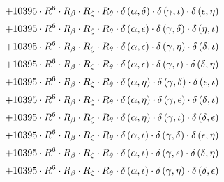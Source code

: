 \begin{subequations}
\begin{gather}
 \\[0.2em] \notag 		 + 10395 \cdot R^{6} \cdot R_{\beta{}} \cdot R_{\zeta{}} \cdot R_{\theta{}} \cdot \delta{}\left(\alpha{}, \delta{}\right) \cdot \delta{}\left(\gamma{}, \iota{}\right) \cdot \delta{}\left(\epsilon{}, \eta{}\right) 
 \\[0.2em] \notag 		 + 10395 \cdot R^{6} \cdot R_{\beta{}} \cdot R_{\zeta{}} \cdot R_{\theta{}} \cdot \delta{}\left(\alpha{}, \epsilon{}\right) \cdot \delta{}\left(\gamma{}, \delta{}\right) \cdot \delta{}\left(\eta{}, \iota{}\right) 
 \\[0.2em] \notag 		 + 10395 \cdot R^{6} \cdot R_{\beta{}} \cdot R_{\zeta{}} \cdot R_{\theta{}} \cdot \delta{}\left(\alpha{}, \epsilon{}\right) \cdot \delta{}\left(\gamma{}, \eta{}\right) \cdot \delta{}\left(\delta{}, \iota{}\right) 
 \\[0.2em] \notag 		 + 10395 \cdot R^{6} \cdot R_{\beta{}} \cdot R_{\zeta{}} \cdot R_{\theta{}} \cdot \delta{}\left(\alpha{}, \epsilon{}\right) \cdot \delta{}\left(\gamma{}, \iota{}\right) \cdot \delta{}\left(\delta{}, \eta{}\right) 
 \\[0.2em] \notag 		 + 10395 \cdot R^{6} \cdot R_{\beta{}} \cdot R_{\zeta{}} \cdot R_{\theta{}} \cdot \delta{}\left(\alpha{}, \eta{}\right) \cdot \delta{}\left(\gamma{}, \delta{}\right) \cdot \delta{}\left(\epsilon{}, \iota{}\right) 
 \\[0.2em] \notag 		 + 10395 \cdot R^{6} \cdot R_{\beta{}} \cdot R_{\zeta{}} \cdot R_{\theta{}} \cdot \delta{}\left(\alpha{}, \eta{}\right) \cdot \delta{}\left(\gamma{}, \epsilon{}\right) \cdot \delta{}\left(\delta{}, \iota{}\right) 
 \\[0.2em] \notag 		 + 10395 \cdot R^{6} \cdot R_{\beta{}} \cdot R_{\zeta{}} \cdot R_{\theta{}} \cdot \delta{}\left(\alpha{}, \eta{}\right) \cdot \delta{}\left(\gamma{}, \iota{}\right) \cdot \delta{}\left(\delta{}, \epsilon{}\right) 
 \\[0.2em] \notag 		 + 10395 \cdot R^{6} \cdot R_{\beta{}} \cdot R_{\zeta{}} \cdot R_{\theta{}} \cdot \delta{}\left(\alpha{}, \iota{}\right) \cdot \delta{}\left(\gamma{}, \delta{}\right) \cdot \delta{}\left(\epsilon{}, \eta{}\right) 
 \\[0.2em] \notag 		 + 10395 \cdot R^{6} \cdot R_{\beta{}} \cdot R_{\zeta{}} \cdot R_{\theta{}} \cdot \delta{}\left(\alpha{}, \iota{}\right) \cdot \delta{}\left(\gamma{}, \epsilon{}\right) \cdot \delta{}\left(\delta{}, \eta{}\right) 
 \\[0.2em] \notag 		 + 10395 \cdot R^{6} \cdot R_{\beta{}} \cdot R_{\zeta{}} \cdot R_{\theta{}} \cdot \delta{}\left(\alpha{}, \iota{}\right) \cdot \delta{}\left(\gamma{}, \eta{}\right) \cdot \delta{}\left(\delta{}, \epsilon{}\right) 

\end{gather}
\end{subequations}

